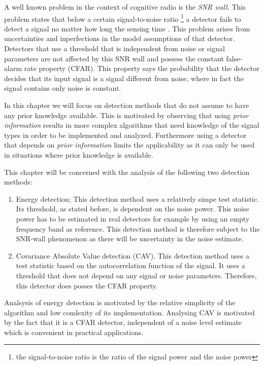 \documentclass[a4paper, openany, oneside]{memoir}
\begin{document}
A well known problem in the context of cognitive radio is the \emph{SNR wall}. This problem states that below a certain signal-to-noise ratio \footnote{the signal-to-noise ratio is the ratio of the signal power and the noise power} a detector fails to detect a signal no matter how long the sensing time \cite{sahai2009spectrum}. This problem arises from uncertainties and inperfections in the model assumptions of that detector. Detectors that use a threshold that is independent from noise or signal parameters are not affected by this SNR wall\cite{axell2012spectrum} and possess the constant false-alarm rate property (CFAR). This property says the probability that the detector decides that its input signal is a signal different from noise, where in fact the signal contains only noise is constant. 

In this chapter we will focus on detection methods that do not assume to have any prior knowledge available. This is motivated by observing that using \emph{prior information} results in more complex algorithms that need knowledge of the signal types in order to be implemented and analyzed. Furthermore using a detector that depends on \emph{prior information} limits the applicability as it can only be used in situations where prior knowledge is available. 

This chapter will be concerned with the analysis of the following two detection methods:

\begin{enumerate}
	\item Energy detection; This detection method uses a relatively simpe test statistic. Its threshold, as stated before, is dependent on 
	the noise power. This noise power has to be estimated in real detectors for example by using an empty frequency band as reference. This detection method is therefore subject to the SNR-wall phenomenon as there will be uncertainty in the noise estimate.
	\item Covariance Absolute Value detection (CAV). This detection method uses a test statistic based on the autocorrelation function of 
	the signal. It uses a threshold that does not depend on any signal or noise parameters. Therefore, this detector does posses the CFAR
	property.
\end{enumerate}

Analsysis of energy detection is motivated by the relative simplicity of the algorithm and low comlexity of its implementation. Analysing CAV is motivated by the fact that it is a CFAR detector, independent of a noise level estimate which is convenient in practical applications\cite{axell2012spectrum}. 
\end{document}
